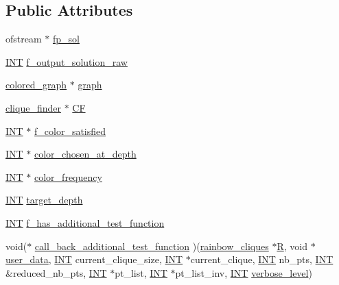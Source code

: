 \subsection*{Public Attributes}
\begin{DoxyCompactItemize}
\item 
ofstream $\ast$ \mbox{\hyperlink{classrainbow__cliques_a72f4548c18f89f9bf06435b9c351fc96}{fp\+\_\+sol}}
\item 
\mbox{\hyperlink{galois_8h_a09fddde158a3a20bd2dcadb609de11dc}{I\+NT}} \mbox{\hyperlink{classrainbow__cliques_a11c5b24cf5386c87b7e968fcf42b18ee}{f\+\_\+output\+\_\+solution\+\_\+raw}}
\item 
\mbox{\hyperlink{classcolored__graph}{colored\+\_\+graph}} $\ast$ \mbox{\hyperlink{classrainbow__cliques_aca596736e48ace9524dc66e067d52884}{graph}}
\item 
\mbox{\hyperlink{classclique__finder}{clique\+\_\+finder}} $\ast$ \mbox{\hyperlink{classrainbow__cliques_a0c492e1c1a81606e92a40e6172221663}{CF}}
\item 
\mbox{\hyperlink{galois_8h_a09fddde158a3a20bd2dcadb609de11dc}{I\+NT}} $\ast$ \mbox{\hyperlink{classrainbow__cliques_a7f4fa7523619d3085e7cf193fc04ce63}{f\+\_\+color\+\_\+satisfied}}
\item 
\mbox{\hyperlink{galois_8h_a09fddde158a3a20bd2dcadb609de11dc}{I\+NT}} $\ast$ \mbox{\hyperlink{classrainbow__cliques_ad5f45258d50fbefcf6fdfd4b5ceb2bc4}{color\+\_\+chosen\+\_\+at\+\_\+depth}}
\item 
\mbox{\hyperlink{galois_8h_a09fddde158a3a20bd2dcadb609de11dc}{I\+NT}} $\ast$ \mbox{\hyperlink{classrainbow__cliques_acf5bbaa5ac97dc5ec70963f52e2ae7dd}{color\+\_\+frequency}}
\item 
\mbox{\hyperlink{galois_8h_a09fddde158a3a20bd2dcadb609de11dc}{I\+NT}} \mbox{\hyperlink{classrainbow__cliques_aea0dd49783560846859917829174e616}{target\+\_\+depth}}
\item 
\mbox{\hyperlink{galois_8h_a09fddde158a3a20bd2dcadb609de11dc}{I\+NT}} \mbox{\hyperlink{classrainbow__cliques_a77159df961ea16141e4972186f50b80e}{f\+\_\+has\+\_\+additional\+\_\+test\+\_\+function}}
\item 
void($\ast$ \mbox{\hyperlink{classrainbow__cliques_a48cd3761f2194d754fceb35e43f86a82}{call\+\_\+back\+\_\+additional\+\_\+test\+\_\+function}} )(\mbox{\hyperlink{classrainbow__cliques}{rainbow\+\_\+cliques}} $\ast$\mbox{\hyperlink{pentomino__5x5_8_c_a9e6c5a8291295bd0292db81cc90cb2cf}{R}}, void $\ast$\mbox{\hyperlink{classrainbow__cliques_a97f8b8a5deca9becc327c69640f66ecc}{user\+\_\+data}}, \mbox{\hyperlink{galois_8h_a09fddde158a3a20bd2dcadb609de11dc}{I\+NT}} current\+\_\+clique\+\_\+size, \mbox{\hyperlink{galois_8h_a09fddde158a3a20bd2dcadb609de11dc}{I\+NT}} $\ast$current\+\_\+clique, \mbox{\hyperlink{galois_8h_a09fddde158a3a20bd2dcadb609de11dc}{I\+NT}} nb\+\_\+pts, \mbox{\hyperlink{galois_8h_a09fddde158a3a20bd2dcadb609de11dc}{I\+NT}} \&reduced\+\_\+nb\+\_\+pts, \mbox{\hyperlink{galois_8h_a09fddde158a3a20bd2dcadb609de11dc}{I\+NT}} $\ast$pt\+\_\+list, \mbox{\hyperlink{galois_8h_a09fddde158a3a20bd2dcadb609de11dc}{I\+NT}} $\ast$pt\+\_\+list\+\_\+inv, \mbox{\hyperlink{galois_8h_a09fddde158a3a20bd2dcadb609de11dc}{I\+NT}} \mbox{\hyperlink{simeon_8_c_a818073fbcc2f439e7c56952f67386122}{verbose\+\_\+level}})

\end{DoxyCompactItemize}
